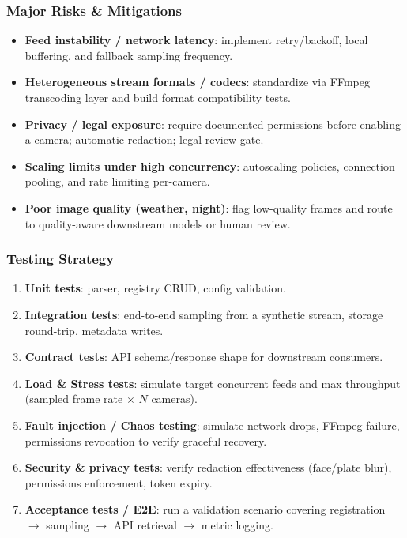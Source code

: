 \subsubsection{Major Risks \& Mitigations}
\begin{itemize}
  \item \textbf{Feed instability / network latency}: implement retry/backoff, local buffering, and fallback sampling frequency.
  \item \textbf{Heterogeneous stream formats / codecs}: standardize via FFmpeg transcoding layer and build format compatibility tests.
  \item \textbf{Privacy / legal exposure}: require documented permissions before enabling a camera; automatic redaction; legal review gate.
  \item \textbf{Scaling limits under high concurrency}: autoscaling policies, connection pooling, and rate limiting per-camera.
  \item \textbf{Poor image quality (weather, night)}: flag low-quality frames and route to quality-aware downstream models or human review.
\end{itemize}

\subsubsection{Testing Strategy}
\begin{enumerate}
  \item \textbf{Unit tests}: parser, registry CRUD, config validation.
  \item \textbf{Integration tests}: end-to-end sampling from a synthetic stream, storage round-trip, metadata writes.
  \item \textbf{Contract tests}: API schema/response shape for downstream consumers.
  \item \textbf{Load \& Stress tests}: simulate target concurrent feeds and max throughput (sampled frame rate $\times$ $N$ cameras).
  \item \textbf{Fault injection / Chaos testing}: simulate network drops, FFmpeg failure, permissions revocation to verify graceful recovery.
  \item \textbf{Security \& privacy tests}: verify redaction effectiveness (face/plate blur), permissions enforcement, token expiry.
  \item \textbf{Acceptance tests / E2E}: run a validation scenario covering registration $\rightarrow$ sampling $\rightarrow$ API retrieval $\rightarrow$ metric logging.
\end{enumerate}

